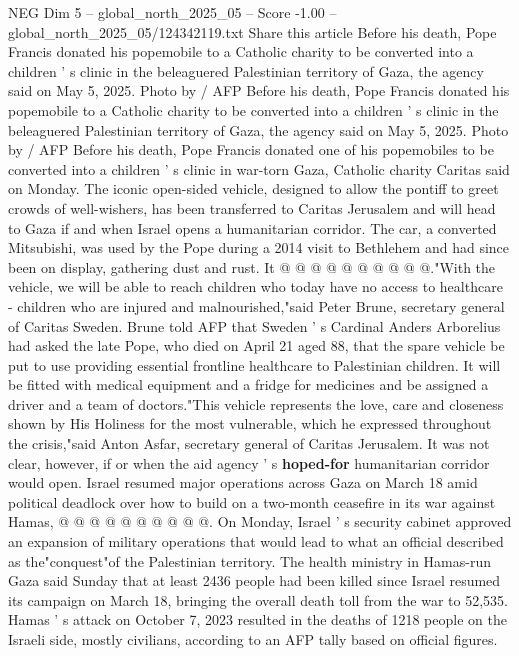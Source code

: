\begin{textsample}{NEG Dim 5 – global\_north\_2025\_05 – Score -1.00 – global\_north\_2025\_05/124342119.txt}  \label{ex:f5_neg_326}
Share this article Before his death, Pope Francis donated his popemobile to a Catholic charity to be converted into a children ' s clinic in the beleaguered Palestinian territory of Gaza, the agency said on May 5, 2025.
Photo by / AFP Before his death, Pope Francis donated his popemobile to a Catholic charity to be converted into a children ' s clinic in the beleaguered Palestinian territory of Gaza, the agency said on May 5, 2025.
Photo by / AFP Before his death, Pope Francis donated one of his popemobiles to be converted into a children ' s clinic in war-torn Gaza, Catholic charity Caritas said on Monday.
The iconic open-sided vehicle, designed to allow the pontiff to greet crowds of well-wishers, has been transferred to Caritas Jerusalem and will head to Gaza if and when Israel opens a humanitarian corridor.
The car, a converted Mitsubishi, was used by the Pope during a 2014 visit to Bethlehem and had since been on display, gathering dust and rust.
It @ @ @ @ @ @ @ @ @ @."With the vehicle, we will be able to reach children who today have no access to healthcare - children who are injured and malnourished,"said Peter Brune, secretary general of Caritas Sweden.
Brune told AFP that Sweden ' s Cardinal Anders Arborelius had asked the late Pope, who died on April 21 aged 88, that the spare vehicle be put to use providing essential frontline healthcare to Palestinian children.
It will be fitted with medical equipment and a fridge for medicines and be assigned a driver and a team of doctors."This vehicle represents the love, care and closeness shown by His Holiness for the most vulnerable, which he expressed throughout the crisis,"said Anton Asfar, secretary general of Caritas Jerusalem.
It was not clear, however, if or when the aid agency ' s \textbf{hoped-for} humanitarian corridor would open.
Israel resumed major operations across Gaza on March 18 amid political deadlock over how to build on a two-month ceasefire in its war against Hamas, @ @ @ @ @ @ @ @ @ @.
On Monday, Israel ' s security cabinet approved an expansion of military operations that would lead to what an official described as the"conquest"of the Palestinian territory.
The health ministry in Hamas-run Gaza said Sunday that at least 2436 people had been killed since Israel resumed its campaign on March 18, bringing the overall death toll from the war to 52,535.
Hamas ' s attack on October 7, 2023 resulted in the deaths of 1218 people on the Israeli side, mostly civilians, according to an AFP tally based on official figures.

\end{textsample}

